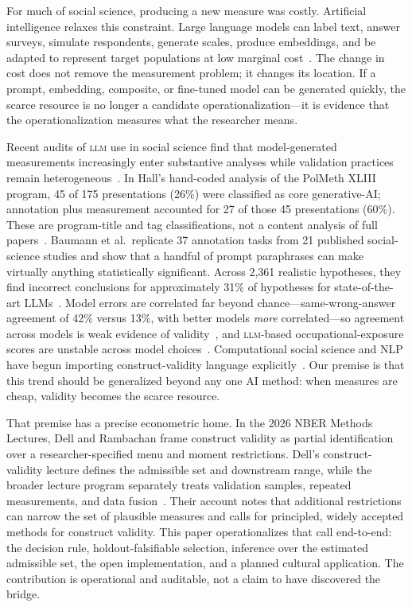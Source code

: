 \documentclass[10pt,letterpaper]{article}
\newcommand{\LLM}{\textsc{llm}}
\begin{document}
For much of social science, producing a new measure was costly.
Artificial intelligence relaxes this constraint.
Large language models can label text, answer surveys, simulate respondents, generate scales, produce embeddings, and be adapted to represent target populations at low marginal cost~\cite{horton2023,argyle2023,aher2023,manning2024,gilardi2023}.
The change in cost does not remove the measurement problem; it changes its location.
If a prompt, embedding, composite, or fine-tuned model can be generated quickly, the scarce resource is no longer a candidate operationalization---it is evidence that the operationalization measures what the researcher means.

Recent audits of \LLM{} use in social science find that model-generated measurements increasingly enter substantive analyses while validation practices remain heterogeneous~\cite{desai2026}.
In Hall's hand-coded analysis of the PolMeth XLIII program, 45 of 175 presentations (26\%) were classified as core generative-AI; annotation plus measurement accounted for 27 of those 45 presentations (60\%). These are program-title and tag classifications, not a content analysis of full papers~\cite{hall2026}.
Baumann et al.\ replicate 37 annotation tasks from 21 published social-science studies and show that a handful of prompt paraphrases can make virtually anything statistically significant. Across 2,361 realistic hypotheses, they find incorrect conclusions for approximately 31\% of hypotheses for state-of-the-art LLMs~\cite{bauman2026}.
Model errors are correlated far beyond chance---same-wrong-answer agreement of 42\% versus 13\%, with better models \emph{more} correlated---so agreement across models is weak evidence of validity~\cite{kim2025}, and \LLM-based occupational-exposure scores are unstable across model choices~\cite{yinvu2026}.
Computational social science and NLP have begun importing construct-validity language explicitly~\cite{proxy2026,halterman2024,bean2025}.
Our premise is that this trend should be generalized beyond any one AI method: when measures are cheap, validity becomes the scarce resource.

That premise has a precise econometric home.
In the 2026 NBER Methods Lectures, Dell and Rambachan frame construct validity as partial identification over a researcher-specified menu and moment restrictions. Dell's construct-validity lecture defines the admissible set and downstream range, while the broader lecture program separately treats validation samples, repeated measurements, and data fusion~\cite{dellrambachan2026,cronbach1955}.
Their account notes that additional restrictions can narrow the set of plausible measures and calls for principled, widely accepted methods for construct validity.
This paper operationalizes that call end-to-end: the decision rule, holdout-falsifiable selection, inference over the estimated admissible set, the open implementation, and a planned cultural application.
The contribution is operational and auditable, not a claim to have discovered the bridge.
\end{document}
